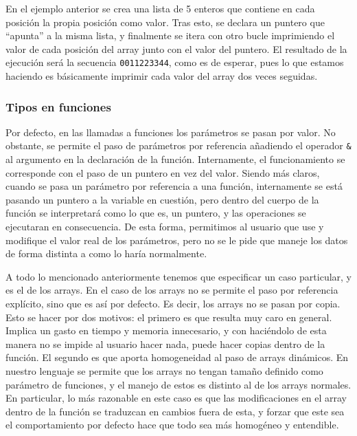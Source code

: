 \documentclass[10pt,a4paper]{article}
\begin{document}


En el ejemplo anterior se crea una lista de 5 enteros que contiene en cada posición la propia posición como valor. Tras esto, se declara un puntero que ``apunta'' a la misma lista, y finalmente se itera con otro bucle imprimiendo el valor de cada posición del array junto con el valor del puntero. El resultado de la ejecución será la secuencia \texttt{\color{blue}0011223344}, como es de esperar, pues lo que estamos haciendo es básicamente imprimir cada valor del array dos veces seguidas.

\subsubsection{Tipos en funciones}
Por defecto, en las llamadas a funciones los parámetros se pasan por valor. No obstante, se permite el paso de parámetros por referencia añadiendo el operador \texttt{\color{blue}\&} al argumento en la declaración de la función. Internamente, el funcionamiento se corresponde con el paso de un puntero en vez del valor. Siendo más claros, cuando se pasa un parámetro por referencia a una función, internamente se está pasando un puntero a la variable en cuestión, pero dentro del cuerpo de la función se interpretará como lo que es, un puntero, y las operaciones se ejecutaran en consecuencia. De esta forma, permitimos al usuario que use y modifique el valor real de los parámetros, pero no se le pide que maneje los datos de forma distinta a como lo haría normalmente.

A todo lo mencionado anteriormente tenemos que especificar un caso particular, y es el de los arrays. En el caso de los arrays no se permite el paso por referencia explícito, sino que es así por defecto. Es decir, los arrays no se pasan por copia. Esto se hacer por dos motivos: el primero es que resulta muy caro en general. Implica un gasto en tiempo y memoria innecesario, y con haciéndolo de esta manera no se impide al usuario hacer nada, puede hacer copias dentro de la función. El segundo es que aporta homogeneidad al paso de arrays dinámicos. En nuestro lenguaje se permite que los arrays no tengan tamaño definido como parámetro de funciones, y el manejo de estos es distinto al de los arrays normales. En particular, lo más razonable en este caso es que las modificaciones en el array dentro de la función se traduzcan en cambios fuera de esta, y forzar que este sea el comportamiento por defecto hace que todo sea más homogéneo y entendible.
\end{document}
